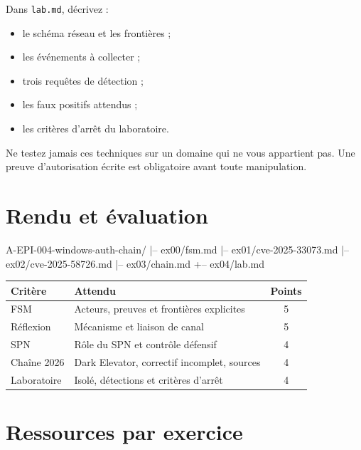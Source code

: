 \documentclass{training}
\begin{document}
Dans \texttt{lab.md}, décrivez :

\begin{itemize}
  \item le schéma réseau et les frontières ;
  \item les événements à collecter ;
  \item trois requêtes de détection ;
  \item les faux positifs attendus ;
  \item les critères d'arrêt du laboratoire.
\end{itemize}

\begin{warn}
Ne testez jamais ces techniques sur un domaine qui ne vous appartient pas.
Une preuve d'autorisation écrite est obligatoire avant toute manipulation.
\end{warn}

\chapter{Rendu et évaluation}

\begin{console}
A-EPI-004-windows-auth-chain/
|-- ex00/fsm.md
|-- ex01/cve-2025-33073.md
|-- ex02/cve-2025-58726.md
|-- ex03/chain.md
+-- ex04/lab.md
\end{console}

\begin{center}
\begin{tabularx}{\linewidth}{|l|X|c|}
\hline
\textbf{Critère} & \textbf{Attendu} & \textbf{Points} \\ \hline
FSM & Acteurs, preuves et frontières explicites & 5 \\ \hline
Réflexion & Mécanisme et liaison de canal & 5 \\ \hline
SPN & Rôle du SPN et contrôle défensif & 4 \\ \hline
Chaîne 2026 & Dark Elevator, correctif incomplet, sources & 4 \\ \hline
Laboratoire & Isolé, détections et critères d'arrêt & 4 \\ \hline
\end{tabularx}
\end{center}

\chapter{Ressources par exercice}
\end{document}
